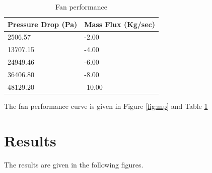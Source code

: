\documentclass[letterpaper,12pt]{article}
\begin{document}
\begin{table}[!h!tbp]
\begin{center}
\begin{tabular}{| l | l | }
\hline
Pressure Drop (Pa) & Mass Flux (Kg/sec) \\
\hline
2506.57 & -2.00 \\
\hline
13707.15 & -4.00 \\
\hline
24949.46 & -6.00 \\
\hline
36406.80 & -8.00 \\
\hline
48129.20 & -10.00 \\
\hline
\end{tabular}
\caption{\label{tab:mp}
Fan performance}
\end{center}
\end{table}

The fan performance curve is given in Figure \ref{fig:mp} and Table
\ref{tab:mp}
\\
\vfill
\newpage
\clearpage
\section{Results}

The results are given in the following figures.
\\
\end{document}
